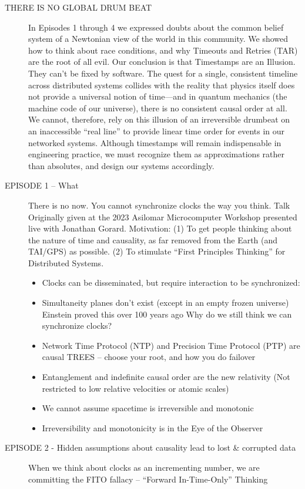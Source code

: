 \documentclass[../HFT-main.tex]{subfiles}
\begin{document}
\begin{description}
\item [THERE IS NO GLOBAL DRUM BEAT] In Episodes 1 through 4 we expressed doubts about the common belief system of a Newtonian view of the world in this community. We showed how to think about race conditions, and why Timeouts and Retries (TAR) are the root of all evil. Our conclusion is that Timestamps are an Illusion. They can’t be fixed by software.
The quest for a single, consistent timeline across distributed systems collides with the reality that physics itself does not provide a universal notion of time—and in quantum mechanics (the machine code of our universe), there is no consistent causal order at all. We cannot, therefore, rely on this illusion of an irreversible drumbeat on an inaccessible “real line” to provide linear time order for events in our networked systems.
Although timestamps will remain indispensable in engineering practice, we must recognize them as approximations rather than absolutes, and design our systems accordingly.
\item [EPISODE 1 -- What] There is no now. You cannot synchronize clocks the way you think. Talk Originally given at the 2023 Asilomar Microcomputer Workshop presented live with Jonathan Gorard.
Motivation: (1) To get people thinking about the nature of time and causality, as far removed from the Earth (and TAI/GPS) as possible. (2) To stimulate ``First Principles Thinking'' for Distributed Systems.%
	\begin{itemize}
	\item  Clocks can be disseminated, but require interaction to be synchronized:
	\item  Simultaneity planes don’t exist (except in an empty frozen universe) Einstein proved this over 100 years ago Why do we still think we can synchronize clocks?
	\item  Network Time Protocol (NTP) and Precision Time Protocol (PTP) are causal TREES -- choose your root, and how you do failover
	\item  Entanglement and indefinite causal order are the new relativity (Not restricted to low relative velocities or atomic scales)
	\item  We cannot assume spacetime is irreversible and monotonic
	\item  Irreversibility and monotonicity is in the Eye of the Observer
	\end{itemize}
\item [EPISODE 2 - Hidden assumptions about causality lead to lost \& corrupted data] When we think about clocks as an incrementing number, we are committing the FITO fallacy -- ``Forward In-Time-Only'' Thinking

\end{description}
\end{document}
